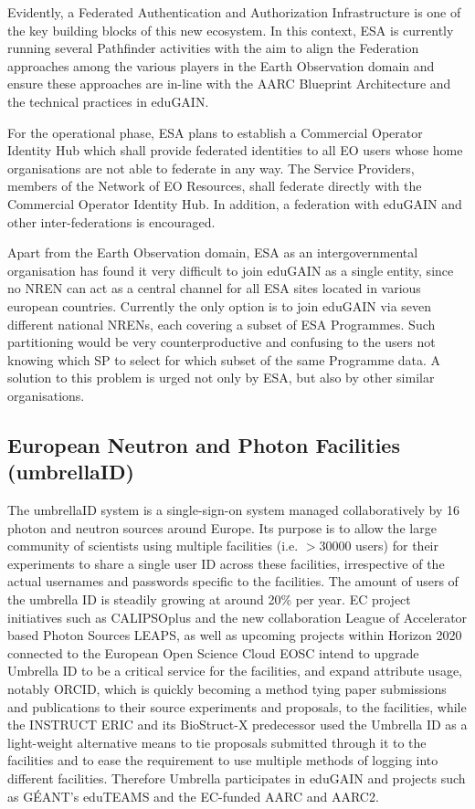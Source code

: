 \documentclass[fleqn,10pt]{wlscirep}
\begin{document}
{Evidently, a Federated Authentication and Authorization Infrastructure is one of the key building blocks of this new ecosystem. In this context, ESA is currently running several Pathfinder activities with the aim to align the Federation approaches among the various players in the Earth Observation domain and ensure these approaches are in-line with the AARC Blueprint Architecture and the technical practices in eduGAIN.

For the operational phase, ESA plans to establish a Commercial Operator Identity Hub which shall provide federated identities to all EO users whose home organisations are not able to federate in any way. The Service Providers, members of the Network of EO Resources, shall federate directly with the Commercial Operator Identity Hub. In addition, a federation with eduGAIN and other inter-federations is encouraged.

Apart from the Earth Observation domain, ESA as an intergovernmental organisation has found it very difficult to join eduGAIN as a single entity, since no NREN can act as a central channel for all ESA sites located in various european countries. Currently the only option is to join eduGAIN via seven different national NRENs, each covering a subset of ESA Programmes. Such partitioning would be very counterproductive and confusing to the users not knowing which SP to select for which subset of the same Programme data. A solution to this problem is urged not only by ESA, but also by other similar organisations.

\subsection{European Neutron and Photon Facilities (umbrellaID)}
The umbrellaID system is a single-sign-on system managed collaboratively by 16 photon and neutron sources around Europe. Its purpose is to allow the large community of scientists using multiple facilities (i.e. $>$30000 users) for their experiments to share a single user ID across these facilities, irrespective of the actual usernames and passwords specific to the facilities. The amount of users of the umbrella ID is steadily growing at around 20\% per year. 
EC project initiatives such as CALIPSOplus and the new collaboration League of Accelerator based Photon Sources LEAPS, as well as upcoming projects within Horizon 2020 connected to the European Open Science Cloud EOSC intend to upgrade Umbrella ID to be a critical service for the facilities, and expand attribute usage, notably ORCID, which is quickly becoming a method tying paper submissions and publications to their source experiments and proposals, to the facilities, while the INSTRUCT ERIC and its BioStruct-X predecessor used the Umbrella ID as a light-weight alternative means to tie proposals submitted through it to the facilities and to ease the requirement to use multiple methods of logging into different facilities. Therefore Umbrella participates  in eduGAIN and projects such as GÉANT’s eduTEAMS and the EC-funded AARC and AARC2.
 
}
\end{document}
